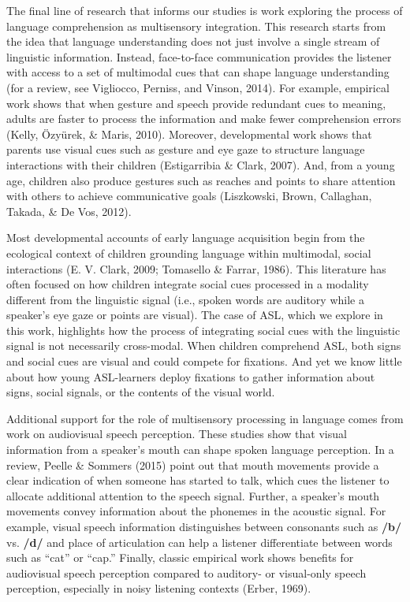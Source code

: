 \documentclass[oneside]{report}
\begin{document}
The final line of research that informs our studies is work exploring
the process of language comprehension as multisensory integration. This
research starts from the idea that language understanding does not just
involve a single stream of linguistic information. Instead, face-to-face
communication provides the listener with access to a set of multimodal
cues that can shape language understanding (for a review, see Vigliocco,
Perniss, and Vinson, 2014). For example, empirical work shows that when
gesture and speech provide redundant cues to meaning, adults are faster
to process the information and make fewer comprehension errors (Kelly,
Özyürek, \& Maris, 2010). Moreover, developmental work shows that
parents use visual cues such as gesture and eye gaze to structure
language interactions with their children (Estigarribia \& Clark, 2007).
And, from a young age, children also produce gestures such as reaches
and points to share attention with others to achieve communicative goals
(Liszkowski, Brown, Callaghan, Takada, \& De Vos, 2012).

Most developmental accounts of early language acquisition begin from the
ecological context of children grounding language within multimodal,
social interactions (E. V. Clark, 2009; Tomasello \& Farrar, 1986). This
literature has often focused on how children integrate social cues
processed in a modality different from the linguistic signal (i.e.,
spoken words are auditory while a speaker's eye gaze or points are
visual). The case of ASL, which we explore in this work, highlights how
the process of integrating social cues with the linguistic signal is not
necessarily cross-modal. When children comprehend ASL, both signs and
social cues are visual and could compete for fixations. And yet we know
little about how young ASL-learners deploy fixations to gather
information about signs, social signals, or the contents of the visual
world.

Additional support for the role of multisensory processing in language
comes from work on audiovisual speech perception. These studies show
that visual information from a speaker's mouth can shape spoken language
perception. In a review, Peelle \& Sommers (2015) point out that mouth
movements provide a clear indication of when someone has started to
talk, which cues the listener to allocate additional attention to the
speech signal. Further, a speaker's mouth movements convey information
about the phonemes in the acoustic signal. For example, visual speech
information distinguishes between consonants such as \textbf{/b/} vs.
\textbf{/d/} and place of articulation can help a listener differentiate
between words such as ``cat'' or ``cap.'' Finally, classic empirical
work shows benefits for audiovisual speech perception compared to
auditory- or visual-only speech perception, especially in noisy
listening contexts (Erber, 1969).
\end{document}
